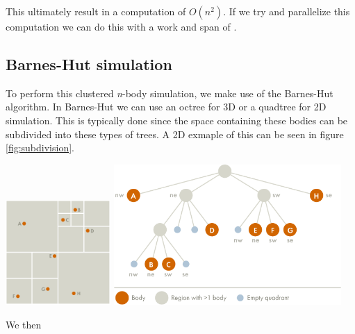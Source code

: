 This ultimately result in a computation of $O(n^2)$.
If we try and parallelize this computation we can do this with a work and span of .

\subsection{Barnes-Hut simulation}
To perform this clustered \textit{n}-body simulation, we make use of the
Barnes-Hut algorithm\cite{BH-algo}. In Barnes-Hut we can use an octree for 3D
or a quadtree for 2D simulation. This is typically done since the space
containing these bodies can be subdivided into these types of trees. A 2D
exmaple of this can be seen in figure \ref{fig:subdivision}.

\begin{Figure}
  \centering
  \includegraphics[width=0.30\textwidth]{assests/example-space}
  \includegraphics[width=0.65\textwidth]{assests/example-tree}
  \label{fig:subdivision}
\end{Figure}

We then
